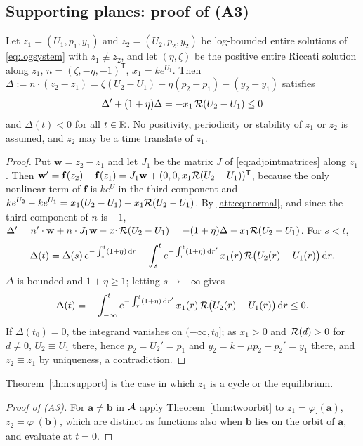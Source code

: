 \subsection{Supporting planes: proof of (A3)}\label{att:sec:support}
\begin{theorem}\label{thm:twoorbit}
Let $z_1=(U_1,p_1,y_1)$ and $z_2=(U_2,p_2,y_2)$ be log-bounded entire solutions of \eqref{eq:logsystem} with $z_1\not\equiv z_2$, and let $(\eta,\zeta)$ be the positive entire Riccati solution along $z_1$, $n=(\zeta,-\eta,-1)^{\mathsf T}$, $x_1=ke^{U_1}$. Then
$\Delta:=n\cdot(z_2-z_1)=\zeta(U_2-U_1)-\eta(p_2-p_1)-(y_2-y_1)$ satisfies
\begin{equation}\label{att:eq:deltaode}
\Delta'+(1+\eta)\Delta=-x_1\,\mathcal R(U_2-U_1)\le0
\end{equation}
and $\Delta(t)<0$ for all $t\in\mathbb R$. No positivity, periodicity or stability of $z_1$ or $z_2$ is assumed, and $z_2$ may be a time translate of $z_1$.
\end{theorem}
\begin{proof}
Put $\mathbf w=z_2-z_1$ and let $J_1$ be the matrix $J$ of \eqref{eq:adjointmatrices} along $z_1$. Then $\mathbf w'=\mathbf f(z_2)-\mathbf f(z_1)=J_1\mathbf w+(0,0,x_1\mathcal R(U_2-U_1))^{\mathsf T}$, because the only nonlinear term of $\mathbf f$ is $ke^{U}$ in the third component and $ke^{U_2}-ke^{U_1}=x_1(U_2-U_1)+x_1\mathcal R(U_2-U_1)$. By \eqref{att:eq:normal}, and since the third component of $n$ is $-1$,
$\Delta'=n'\cdot\mathbf w+n\cdot J_1\mathbf w-x_1\mathcal R(U_2-U_1)=-(1+\eta)\Delta-x_1\mathcal R(U_2-U_1)$. For $s<t$,
\[
\Delta(t)=\Delta(s)\,e^{-\int_s^t(1+\eta)\,\mathrm dr}-\int_s^te^{-\int_r^t(1+\eta)\,\mathrm dr'}\,x_1(r)\,\mathcal R\bigl(U_2(r)-U_1(r)\bigr)\,\mathrm dr .
\]
$\Delta$ is bounded and $1+\eta\ge1$; letting $s\to-\infty$ gives
\[
\Delta(t)=-\int_{-\infty}^te^{-\int_r^t(1+\eta)\,\mathrm dr'}\,x_1(r)\,\mathcal R\bigl(U_2(r)-U_1(r)\bigr)\,\mathrm dr\le0 .
\]
If $\Delta(t_0)=0$, the integrand vanishes on $(-\infty,t_0]$; as $x_1>0$ and $\mathcal R(d)>0$ for $d\ne0$, $U_2\equiv U_1$ there, hence $p_2=U_2'=p_1$ and $y_2=k-\mu p_2-p_2'=y_1$ there, and $z_2\equiv z_1$ by uniqueness, a contradiction.
\end{proof}
Theorem~\ref{thm:support} is the case in which $z_1$ is a cycle or the equilibrium.
\begin{proof}[Proof of (A3)]
For $\mathbf a\ne\mathbf b$ in $\mathcal A$ apply Theorem~\ref{thm:twoorbit} to $z_1=\varphi_{\cdot}(\mathbf a)$, $z_2=\varphi_{\cdot}(\mathbf b)$, which are distinct as functions also when $\mathbf b$ lies on the orbit of $\mathbf a$, and evaluate at $t=0$.
\end{proof}

